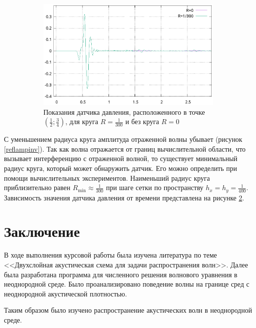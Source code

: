 \documentclass[a4paper, fontsize=14pt]{article}
\begin{document}
\begin{figure}
	\begin{subfigure}{\textwidth}
	\centering
	\includegraphics[width=1\textwidth]{sensor.eps}
	\caption{Показания датчика давления, расположенного в точке
	$\left(\frac{1}{2};\frac{3}{4}\right)$, для круга $R = \frac{1}{300}$ и без круга $R=0$}
	\label{sensor}
	\end{subfigure}
    \caption{}
\end{figure}

С уменьшением радиуса круга амплитуда отраженной волны убывает (рисунок \ref{reflampinv}). Так как
волна отражается от границ вычислительной области, что вызывает интерференцию с отраженной волной, 
то существует минимальный радиус круга, который может обнаружить датчик.
Его можно определить при помощи вычислительных экспериментов. Наименьший радиус круга
приблизительно равен $R_\text{min} \approx \frac{1}{300}$ при шаге сетки по пространству $h_x = h_y
= \frac{1}{400}$. Зависимость значения датчика давления от времени представлена на рисунке
\ref{sensor}.

\clearpage

\section*{Заключение}
%
В ходе выполнения курсовой работы была изучена литература по теме <<Двухслойная акустическая схема
для задачи распространения волн>>. Далее была разработана программа для численного решения волнового
уравнения в неоднородной среде. Было проанализировано поведение волны на границе сред с неоднородной
акустической плотностью.

Таким образом было изучено распространение акустических волн в неоднородной среде.
\end{document}
